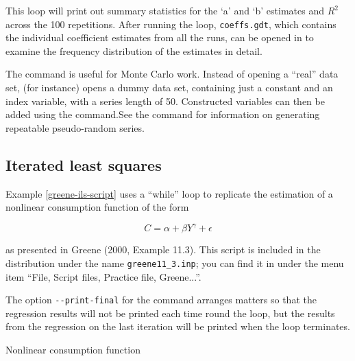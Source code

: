 This loop will print out summary statistics for the `a' and `b'
estimates and $R^2$ across the 100 repetitions.  After running the
loop, \verb+coeffs.gdt+, which contains the individual coefficient
estimates from all the runs, can be opened in  to examine
the frequency distribution of the estimates in detail.

The command  is useful for Monte Carlo work.  Instead of
opening a ``real'' data set,  (for instance) opens a
dummy data set, containing just a constant and an index variable, with
a series length of 50. Constructed variables can then be added using
the  command.See the  command for information on
generating repeatable pseudo-random series.

\subsection{Iterated least squares}
\label{loop-ils-examples}

Example \ref{greene-ils-script} uses a ``while'' loop to replicate the
estimation of a nonlinear consumption function of the form
	
\[ C = \alpha + \beta Y^{\gamma} + \epsilon \]

as presented in Greene (2000, Example 11.3).  This script is included
in the  distribution under the name \verb+greene11_3.inp+;
you can find it in  under the menu item ``File, Script files,
Practice file, Greene...''.

The option \verb+--print-final+ for the  command arranges
matters so that the regression results will not be printed each time
round the loop, but the results from the regression on the last
iteration will be printed when the loop terminates.

\begin{script}[htbp]
  \caption{Nonlinear consumption function}
  \label{greene-ils-script}
\end{script}

